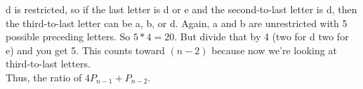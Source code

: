 \documentclass[10pt, AMS Euler]{article}
\begin{document}
    d is restricted, so if the last letter is d or e and the second-to-last letter is d, then the third-to-last letter can be a, b, or d. Again, a and b are unrestricted with 5 possible preceding letters. So $5 * 4 = 20$. But divide that by 4 (two for d two for e) and you get 5. This counts toward $(n-2)$ because now we're looking at third-to-last letters.\\

    Thus, the ratio of $4P_{n-1}+P_{n-2}$.\\



\end{document}
